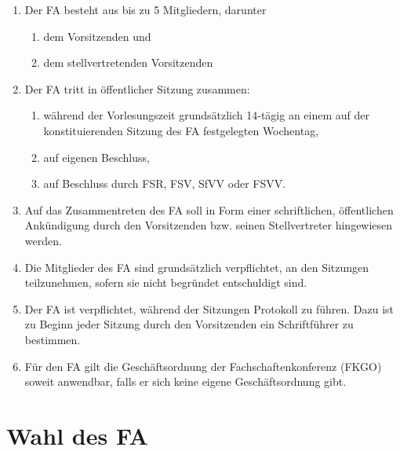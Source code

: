 \documentclass{article}
\begin{document}
\begin{enumerate}[(1)]
	\item Der FA besteht aus bis zu 5 Mitgliedern, darunter
	\begin{enumerate}[1.]
		\item dem Vorsitzenden und
		\item dem stellvertretenden Vorsitzenden
	\end{enumerate}
	\item Der FA tritt in öffentlicher Sitzung zusammen:
	\begin{enumerate}
		\item während der Vorlesungszeit grundsätzlich 14-tägig an einem auf der konstituierenden Sitzung des FA festgelegten Wochentag,
		\item auf eigenen Beschluss,
		\item auf Beschluss durch FSR, FSV, SfVV oder FSVV.
	\end{enumerate}
	\item Auf das Zusammentreten des FA soll in Form einer schriftlichen, öffentlichen Ankündigung durch den Vorsitzenden bzw. seinen Stellvertreter hingewiesen werden.
	\item Die Mitglieder des FA sind grundsätzlich verpflichtet, an den Sitzungen teilzunehmen, sofern sie nicht begründet entschuldigt sind.
	\item Der FA ist verpflichtet, während der Sitzungen Protokoll zu führen. Dazu ist zu Beginn jeder Sitzung durch den Vorsitzenden ein Schriftführer zu bestimmen.
	\item Für den FA gilt die Geschäftsordnung der Fachschaftenkonferenz (FKGO) soweit anwendbar, falls er sich keine eigene Geschäftsordnung gibt.
\end{enumerate}

\section{Wahl des FA}\label{wahl-des-fa}
\end{document}
